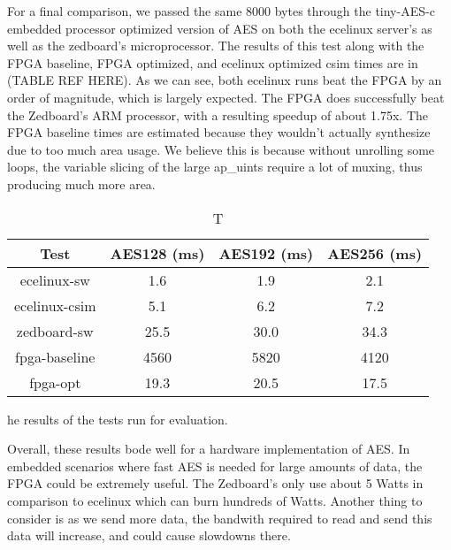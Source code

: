 For a final comparison, we passed the same 8000 bytes through the tiny-AES-c embedded processor optimized version of AES on both the ecelinux server's as well as the zedboard's microprocessor. The results of this test along with the FPGA baseline, FPGA optimized, and ecelinux optimized csim times are in (TABLE REF HERE). As we can see, both ecelinux runs beat the FPGA by an order of magnitude, which is largely expected. The FPGA does successfully beat the Zedboard's ARM processor, with a resulting speedup of about 1.75x. The FPGA baseline times are estimated because they wouldn't actually synthesize due to too much area usage. We believe this is because without unrolling some loops, the variable slicing of the large ap\_uints require a lot of muxing, thus producing much more area. 

\begin{table}
\begin{center}
\begin{tabular}{| c | c | c | c |}\hline
Test & AES128 (ms) & AES192 (ms) & AES256 (ms) \\\hline
ecelinux-sw & 1.6 & 1.9 & 2.1 \\\hline
ecelinux-csim & 5.1 & 6.2 & 7.2 \\\hline
zedboard-sw & 25.5 & 30.0 & 34.3 \\\hline
fpga-baseline & 4560 & 5820 & 4120 \\\hline
fpga-opt & 19.3 & 20.5 & 17.5 \\\hline
\end{tabular}
\caption The results of the tests run for evaluation.
\end{center}
\end{table}

Overall, these results bode well for a hardware implementation of AES. In embedded scenarios where fast AES is needed for large amounts of data, the FPGA could be extremely useful. The Zedboard's only use about 5 Watts in comparison to ecelinux which can burn hundreds of Watts. Another thing to consider is as we send more data, the bandwith required to read and send this data will increase, and could cause slowdowns there. 